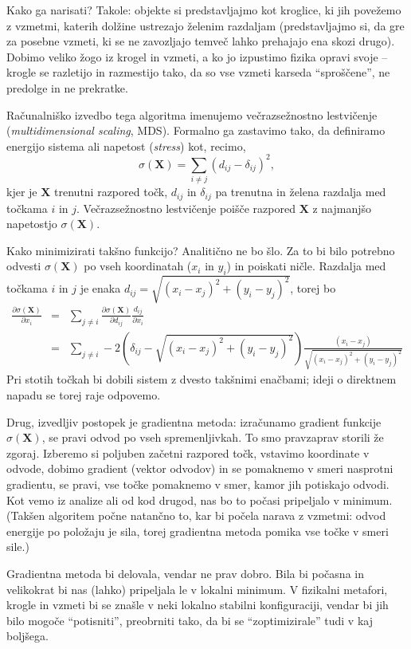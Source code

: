 Kako ga narisati? Takole: objekte si predstavljajmo kot kroglice, ki jih povežemo z vzmetmi, katerih dolžine ustrezajo želenim razdaljam (predstavljajmo si, da gre za posebne vzmeti, ki se ne zavozljajo temveč lahko prehajajo ena skozi drugo). Dobimo veliko žogo iz krogel in vzmeti, a ko jo izpustimo fizika opravi svoje -- krogle se razletijo in razmestijo tako, da so vse vzmeti karseda ``sproščene'', ne predolge in ne prekratke.

Računalniško izvedbo tega algoritma imenujemo večrazsežnostno lestvičenje ({\em multidimensional scaling}, MDS). Formalno ga zastavimo tako, da definiramo energijo sistema ali napetost ({\em stress}) kot, recimo,
$$\sigma(\mathbf{X}) = \sum_{i\ne j} (d_{ij} - \delta_{ij})^2,$$
kjer je $\mathbf{X}$ trenutni razpored točk, $d_{ij}$ in $\delta_{ij}$ pa trenutna in želena razdalja med točkama $i$ in $j$. Večrazsežnostno lestvičenje poišče razpored $\mathbf{X}$ z najmanjšo napetostjo $\sigma(\mathbf{X})$.

Kako minimizirati takšno funkcijo? Analitično ne bo šlo. Za to bi bilo potrebno odvesti $\sigma(\mathbf{X})$ po vseh koordinatah ($x_i$ in $y_i$) in poiskati ničle. Razdalja med točkama $i$ in $j$ je enaka $d_{ij}=\sqrt{(x_i-x_j)^2+(y_i-y_j)^2}$, torej bo
\begin{eqnarray*}\frac{\partial\sigma({\mathbf{X}})}{\partial x_i} & = &
\sum_{j\ne i} \frac{\partial\sigma({\mathbf{X}})}{\partial d_{ij}}\frac{d_{ij}}{\partial x_i} \\ & =
& \sum_{j\ne i} -2\left(\delta_{ij}-\sqrt{(x_i-x_j)^2+(y_i-y_j)^2}\right) \frac{(x_i-x_j)}{\sqrt{(x_i-x_j)^2+(y_i-y_j)^2}}
\end{eqnarray*}
Pri stotih točkah bi dobili sistem z dvesto takšnimi enačbami; ideji o direktnem napadu se torej raje odpovemo.

Drug, izvedljiv postopek je gradientna metoda: izračunamo gradient funkcije $\sigma(\mathbf{X})$, se pravi odvod po vseh spremenljivkah. To smo pravzaprav storili že zgoraj. Izberemo si poljuben začetni razpored točk, vstavimo koordinate v odvode, dobimo gradient (vektor odvodov) in se pomaknemo v smeri nasprotni gradientu, se pravi, vse točke pomaknemo v smer, kamor jih potiskajo odvodi. Kot vemo iz analize ali od kod drugod, nas bo to počasi pripeljalo v minimum. (Takšen algoritem počne natančno to, kar bi počela narava z vzmetmi: odvod energije po položaju je sila, torej gradientna metoda pomika vse točke v smeri sile.)

Gradientna metoda bi delovala, vendar ne prav dobro. Bila bi počasna in velikokrat bi nas (lahko) pripeljala le v lokalni minimum. V fizikalni metafori, krogle in vzmeti bi se znašle v neki lokalno stabilni konfiguraciji, vendar bi jih bilo mogoče ``potisniti'', preobrniti tako, da bi se ``zoptimizirale'' tudi v kaj boljšega.

